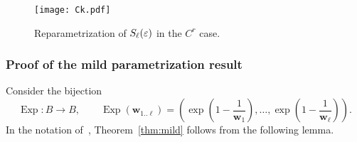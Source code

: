 \documentclass[reqno]{amsart}
\renewcommand\~[1]{\widetilde{#1}}
\def\vw{{\mathbf w}}
\def\Exp{\operatorname{Exp}}
\begin{document}
\begin{figure}
  \centering
  \texttt{[image: Ck.pdf]}
  \caption{Reparametrization of $S_\ell(\varepsilon)$ in the $C^r$ case.}
  \label{fig:Ck}
\end{figure}

\subsubsection{Proof of the mild parametrization result}

Consider the bijection
\begin{equation}
  \Exp:B\to B, \qquad
  \Exp(\vw_{1..\ell})=\left(\exp\left(1-\frac1{\vw_1}\right),\dots,\exp\left(1-\frac1{\vw_\ell}\right)\right).
\end{equation}
In the notation of~, Theorem~\ref{thm:mild}
follows from the following lemma.
\end{document}
